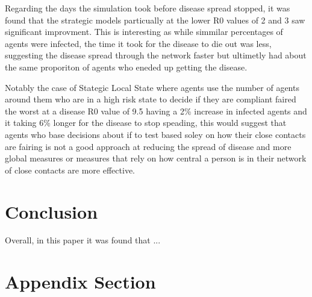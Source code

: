 \documentclass{article}
\begin{document}
Regarding the days the simulation took before disease spread stopped, it was found that the strategic models particually at the lower R0 values of 2 and 3 saw significant improvment. This is interesting as while simmilar percentages of agents were infected, the time it took for the disease to die out was less, suggesting the disease spread through the network faster but ultimetly had about the same proporiton of agents who eneded up getting the disease.

Notably the case of Stategic Local State where agents use the number of agents around them who are in a high risk state to decide if they are compliant faired the worst at a disease R0 value of 9.5 having a 2\% increase in infected agents and it taking 6\% longer for the disease to stop speading, this would suggest that agents who base decisions about if to test based soley on how their close contacts are fairing is not a good approach at reducing the spread of disease and more global measures or measures that rely on how central a person is in their network of close contacts are more effective. 


\section{Conclusion}
Overall, in this paper it was found that  ...




\newpage
\appendix

\section{Appendix Section}


{}

\end{document}
